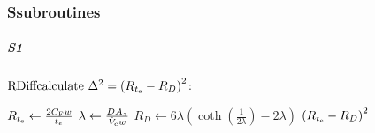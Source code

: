 \subsubsection*{S\quad subroutines}
\subparagraph{S1}
$\text{RDiff} \\ \text{calculate}~\Delta^2 = \left(  R_{t_\text{e}} - R_D\right)^2$:
\begin{algorithmic}
  \State $R_{t_\text{e}} \leftarrow \frac{2 C_\text{F} w}{t_e} $
  \State $\lambda \leftarrow \frac{D A_z}{\dot{V}_\text{c} w}$
  \State $R_D \leftarrow 6\lambda \left( \coth{\left( \frac{1}{2\lambda} \right) } - 2\lambda \right)$
  \State \Return $\left(R_{t_\text{e}} - R_D\right)^2$
\end{algorithmic}
\clearpage